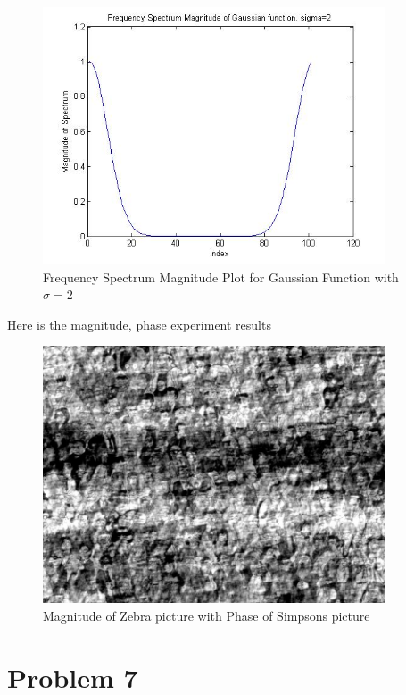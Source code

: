 \documentclass[11pt,psfig]{article}
\begin{document}
\begin{figure}[H]
\centering
\includegraphics[height=3in]{prob6plot_freqGauss2.jpg}
\caption{Frequency Spectrum Magnitude Plot for Gaussian Function with $\sigma=2$}
\end{figure}

Here is the magnitude, phase experiment results

\begin{figure}[H]
\centering
\includegraphics[height=3in]{mag_zebra_phase_simpsons.jpg}
\caption{Magnitude of Zebra picture with Phase of Simpsons picture}
\end{figure}

\section*{Problem 7}
\end{document}
